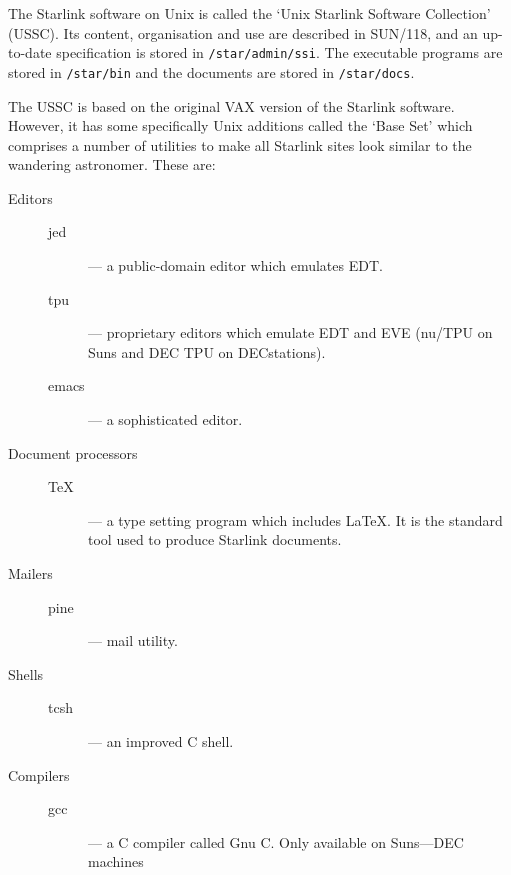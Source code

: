 The Starlink software on Unix is called the `Unix Starlink Software Collection'
(USSC).
Its content, organisation and use are described in SUN/118, and an up-to-date
specification is stored in {\tt /star/admin/ssi}.
The executable programs are stored in {\tt /star/bin} and the documents
are stored in {\tt /star/docs}.

The USSC is based on the original VAX version of the Starlink software.
However, it has some specifically Unix additions called the `Base Set' which
comprises a number of utilities to make all Starlink sites look similar to the
wandering astronomer.
These are:
\begin{description}
\begin{description}
\item [Editors]  \hspace*{\fill}
\begin{description}
\item [jed] --- a public-domain editor which emulates EDT.
\item [tpu] --- proprietary editors which emulate EDT and EVE (nu/TPU on Suns
 and DEC TPU on DECstations).
\item [emacs] --- a sophisticated editor.
\end{description}
\item [Document processors]  \hspace*{\fill}
\begin{description}
\item [TeX] --- a type setting program which includes \LaTeX. It is the
 standard tool used to produce Starlink documents.
\end{description}
\item [Mailers] \hspace*{\fill}
\begin{description}
\item [pine] --- mail utility.
\end{description}
\item [Shells] \hspace*{\fill}
\begin{description}
\item [tcsh] --- an improved C shell.
\end{description}
\item [Compilers] \hspace*{\fill}
\begin{description}
\item [gcc] --- a C compiler called Gnu C. Only available on Suns---DEC machines

\end{description}
\end{description}
\end{description}
